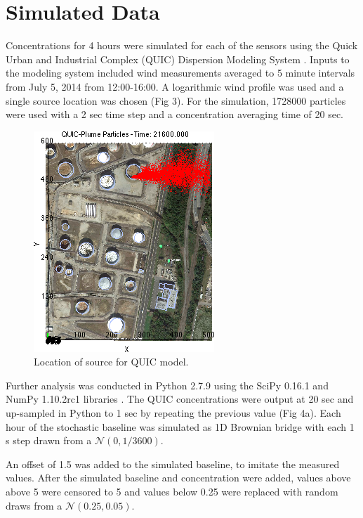 \documentclass[fontsize=11pt]{scrartcl} %
\begin{document}
\section{Simulated Data}

Concentrations for 4 hours were simulated for each of the sensors using the Quick Urban and Industrial Complex (QUIC) Dispersion Modeling System \cite{QUIC}.  Inputs to the modeling system included wind measurements averaged to 5 minute intervals from July 5, 2014 from 12:00-16:00. A logarithmic wind profile was used and a single source location was chosen (Fig 3).  For the simulation, 1728000 particles were used with a 2 sec time step and a concentration averaging time of 20 sec.  
\par

\begin{figure}[h!]
	\centering
	\includegraphics[width = 0.5\linewidth]{QUIC_fig}
	\caption{Location of source for QUIC model.}
\end{figure}

Further analysis was conducted in Python 2.7.9 \cite{python} using the SciPy 0.16.1 and NumPy 1.10.2rc1 libraries \cite{scipy}. The QUIC concentrations were output at 20 sec and up-sampled in Python to 1 sec by repeating the previous value (Fig 4a). Each hour of the stochastic baseline was simulated as 1D Brownian bridge with each 1 s step drawn from a $\mathcal{N}(0, 1/3600)$.

An offset of 1.5 was added to the simulated baseline, to imitate the measured values. After the simulated baseline and concentration were added, values above above 5 were censored to 5 and values below 0.25 were replaced with random draws from a $\mathcal{N}(0.25, 0.05)$.  

\newpage
\end{document}
